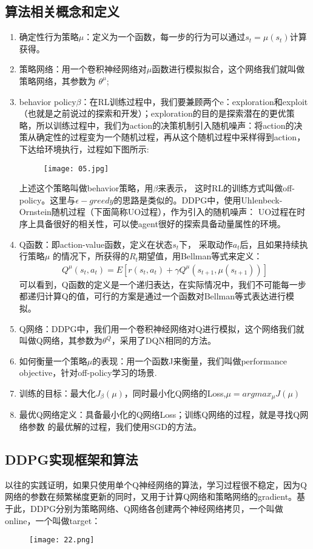 \documentclass[12pt]{article}
\begin{document}
\subsection{算法相关概念和定义}
\begin{enumerate}
	\item 确定性行为策略$\mu$：定义为一个函数，每一步的行为可以通过$s_t=\mu(s_t)$计算获得。
	\item 策略网络：用一个卷积神经网络对$\mu$函数进行模拟拟合，这个网络我们就叫做策略网络，其参数为 $\theta^\mu$;
	\item behavior policy$\beta$：在RL训练过程中，我们要兼顾两个e：exploration和exploit（也就是之前说过的探索和开发）；exploration的目的是探索潜在的更优策略，所以训练过程中，我们为action的决策机制引入随机噪声：将action的决策从确定性的过程变为一个随机过程，再从这个随机过程中采样得到action，下达给环境执行，过程如下图所示:
	\begin{figure}[htbp]
		\centering
		\texttt{[image: 05.jpg]}
	\end{figure}
	上述这个策略叫做behavior策略，用$\beta$来表示，
	这时RL的训练方式叫做off-policy。这里与$\epsilon-greedy$的思路是类似的。DDPG中，使用Uhlenbeck-Ornstein随机过程（下面简称UO过程），作为引入的随机噪声：
	UO过程在时序上具备很好的相关性，可以使agent很好的探索具备动量属性的环境。
    \item Q函数：即action-value函数，定义在状态$s_t$下，
	采取动作$a_t$后，且如果持续执行策略$\mu$
    的情况下，所获得的$R_t$期望值，用Bellman等式来定义：
	\begin{align}
		Q^\mu(s_t,a_t)=E[r(s_t,a_t)+\gamma Q^\mu(s_{t+1},\mu(s_{t+1}))]
	\end{align}
	可以看到，Q函数的定义是一个递归表达，在实际情况中，我们不可能每一步都递归计算Q的值，可行的方案是通过一个函数对Bellman等式表达进行模拟。
	\item Q网络：DDPG中，我们用一个卷积神经网络对Q进行模拟，这个网络我们就叫做Q网络，其参数为$\theta^Q$，采用了DQN相同的方法。
    \item  如何衡量一个策略$\mu$的表现：用一个函数J来衡量，我们叫做performance objective，针对off-policy学习的场景.
    \item 训练的目标：最大化$J_\beta(\mu)$，同时最小化Q网络的Loss,$\mu=argmax_\mu J(\mu)$
    \item 最优Q网络定义：具备最小化的Q网络Loss；训练Q网络的过程，就是寻找Q网络参数 
的最优解的过程，我们使用SGD的方法。
\end{enumerate}

\subsection{DDPG实现框架和算法}
以往的实践证明，如果只使用单个Q神经网络的算法，学习过程很不稳定，因为Q网络的参数在频繁梯度更新的同时，又用于计算Q网络和策略网络的gradient。基于此，DDPG分别为策略网络、Q网络各创建两个神经网络拷贝，一个叫做online，一个叫做target：
\begin{figure}[htbp]
	\centering
	\texttt{[image: 22.png]}
\end{figure}
\end{document}
